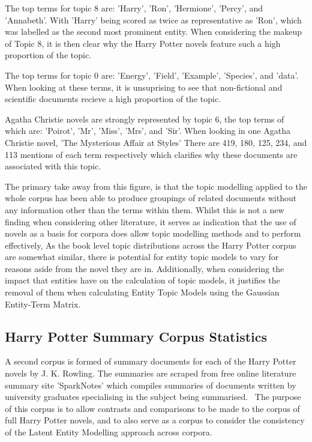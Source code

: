 \documentclass[10pt]{report}
\begin{document}
The top terms for topic 8 are: 'Harry', 'Ron', 'Hermione', 'Percy', and 'Annabeth'. With 'Harry' being scored as twice as representative as 'Ron', which was labelled as the second most prominent entity. When considering the makeup of Topic 8, it is then clear why the Harry Potter novels feature such a high proportion of the topic.

The top terms for topic 0 are: 'Energy', 'Field', 'Example', 'Species', and 'data'. When looking at these terms, it is unsuprising to see that non-fictional and scientific documents recieve a high proportion of the topic.

Agatha Christie novels are strongly represented by topic 6, the top terms of which are: 'Poirot', 'Mr', 'Miss', 'Mrs', and 'Sir'. When looking in one Agatha Christie novel, 'The Mysterious Affair at Styles' There are 419, 180, 125, 234, and 113 mentions of each term respectively which clarifies why these documents are associated with this topic.

The primary take away from this figure, is that the topic modelling applied to the whole corpus has been able to produce groupings of related documents without any information other than the terms within them. Whilst this is not a new finding when considering other literature, it serves as indication that the use of novels as a basis for corpora does allow topic modelling methods and to perform effectively, As the book level topic distributions across the Harry Potter corpus are somewhat similar, there is potential for entity topic models to vary for reasons aside from the novel they are in. Additionally, when considering the impact that entities have on the calculation of topic models, it justifies the removal of them when calculating Entity Topic Models using the Gaussian Entity-Term Matrix.

\subsection{Harry Potter Summary Corpus Statistics}
A second corpus is formed of summary documents for each of the Harry Potter novels by J. K. Rowling. The summaries are scraped from free online literature summary site 'SparkNotes' which compiles summaries of documents written by university graduates specialising in the subject being summarised.~\cite{noauthor_undated-kh} The purpose of this corpus is to allow contrasts and comparisons to be made to the corpus of full Harry Potter novels, and to also serve as a corpus to consider the consistency of the Latent Entity Modelling approach across corpora.
\end{document}
